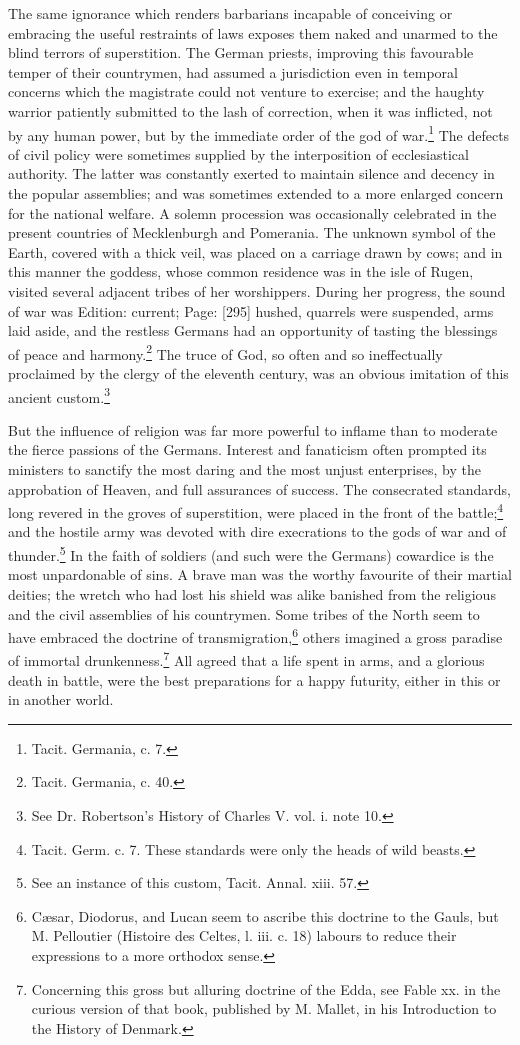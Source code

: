 The same ignorance which renders barbarians incapable of conceiving or embracing the useful restraints of laws exposes them naked and unarmed to the blind terrors of superstition. The German priests, improving this favourable temper of their countrymen, had assumed a jurisdiction even in temporal concerns which the magistrate could not venture to exercise; and the haughty warrior patiently submitted to the lash of correction, when it was inflicted, not by any human power, but by the immediate order of the god of war.\footnote{Tacit. Germania, c. 7.} The defects of civil policy were sometimes supplied by the interposition of ecclesiastical authority. The latter was constantly exerted to maintain silence and decency in the popular assemblies; and was sometimes extended to a more enlarged concern for the national welfare. A solemn procession was occasionally celebrated in the present countries of Mecklenburgh and Pomerania. The unknown symbol of the Earth, covered with a thick veil, was placed on a carriage drawn by cows; and in this manner the goddess, whose common residence was in the isle of Rugen, visited several adjacent tribes of her worshippers. During her progress, the sound of war was Edition: current; Page: [295] hushed, quarrels were suspended, arms laid aside, and the restless Germans had an opportunity of tasting the blessings of peace and harmony.\footnote{Tacit. Germania, c. 40.} The truce of God, so often and so ineffectually proclaimed by the clergy of the eleventh century, was an obvious imitation of this ancient custom.\footnote{See Dr. Robertson\texthebrew{}’s History of Charles V. vol. i. note 10.}

But the influence of religion was far more powerful to inflame than to moderate the fierce passions of the Germans. Interest and fanaticism often prompted its ministers to sanctify the most daring and the most unjust enterprises, by the approbation of Heaven, and full assurances of success. The consecrated standards, long revered in the groves of superstition, were placed in the front of the battle;\footnote{Tacit. Germ. c. 7. These standards were only the heads of wild beasts.} and the hostile army was devoted with dire execrations to the gods of war and of thunder.\footnote{See an instance of this custom, Tacit. Annal. xiii. 57.} In the faith of soldiers (and such were the Germans) cowardice is the most unpardonable of sins. A brave man was the worthy favourite of their martial deities; the wretch who had lost his shield was alike banished from the religious and the civil assemblies of his countrymen. Some tribes of the North seem to have embraced the doctrine of transmigration,\footnote{Cæsar, Diodorus, and Lucan seem to ascribe this doctrine to the Gauls, but M. Pelloutier (Histoire des Celtes, l. iii. c. 18) labours to reduce their expressions to a more orthodox sense.} others imagined a gross paradise of immortal drunkenness.\footnote{Concerning this gross but alluring doctrine of the Edda, see Fable xx. in the curious version of that book, published by M. Mallet, in his Introduction to the History of Denmark.} All agreed that a life spent in arms, and a glorious death in battle, were the best preparations for a happy futurity, either in this or in another world.

